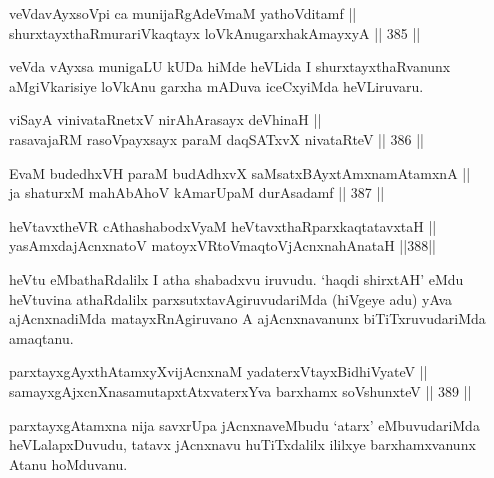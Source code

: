 \begin{shl}
veVdavAyxsoV\s pi ca munijaRgAdeVmaM yathoVditamf || \\
shurxtayxthaRmurariVkaqtayx loVkAnugarxhakAmayxyA \hfill || 385 ||  
\end{shl}

\begin{artha}
veVda vAyxsa munigaLU kUDa hiMde heVLida I shurxtayxthaRvanunx
aMgiVkarisiye loVkAnu garxha mADuva iceCxyiMda heVLiruvaru.
\end{artha}


\begin{shl}
viSayA vinivataRnetxV nirAhArasayx deVhinaH || \\
rasavajaRM rasoV\s payxsayx paraM daqSATxvX nivataRteV \hfill || 386 ||  
\end{shl}

\begin{shl}
EvaM budedhxVH paraM budAdhxvX saMsatxBAyx\s \s tAmxnamAtamxnA || \\
ja shaturxM mahAbAhoV kAmarUpaM durAsadamf \hfill || 387 ||  
\end{shl}



\begin{shl}
heVtavxtheVR cAthashabodxV\s yaM heVtavxthaRparxkaqtatavxtaH || \\
yasAmxdajAcnxnatoV matoyxVR\s toV\s maqtoV\s jAcnxnahAnataH \hfill ||388||  
\end{shl}

\begin{artha}
heVtu eMbathaRdalilx I atha shabadxvu iruvudu. `haqdi shirxtAH' eMdu
heVtuvina athaRdalilx parxsutxtavAgiruvudariMda (hiVgeye adu) yAva
ajAcnxnadiMda matayxRnAgiruvano A ajAcnxnavanunx biTiTxruvudariMda
amaqtanu.
\end{artha}


\begin{shl}
parxtayxgAyxthAtamxyXvijAcnxnaM yadaterxVtayxBidhiVyateV || \\
samayxgAjxcnXnasamutapxtAtxvaterxYva barxhamx soV\s shunxteV \hfill || 389 ||  
\end{shl}

\begin{artha}
parxtayxgAtamxna nija savxrUpa jAcnxnaveMbudu `atarx' eMbuvudariMda
heVLalapxDuvudu, tatavx jAcnxnavu huTiTxdalilx ililxye barxhamxvanunx
Atanu hoMduvanu.
\end{artha}

